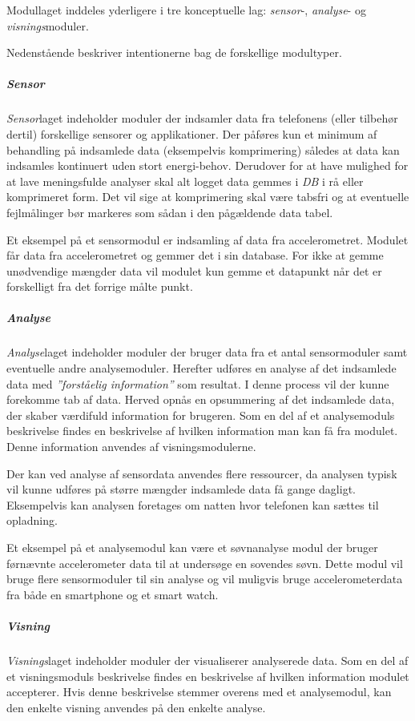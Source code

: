 Modullaget inddeles yderligere i tre konceptuelle lag: \textit{sensor}-, \textit{analyse}- og \textit{visnings}moduler.

Nedenstående beskriver intentionerne bag de forskellige modultyper.

\subparagraph{Sensor}
\textit{Sensor}laget indeholder moduler der indsamler data fra telefonens (eller tilbehør dertil) forskellige sensorer og applikationer.
Der påføres kun et minimum af behandling på indsamlede data (eksempelvis komprimering) således at data kan indsamles kontinuert uden stort energi-behov.
Derudover for at have mulighed for at lave meningsfulde analyser skal alt logget data gemmes i \textit{DB} i rå eller komprimeret form.
Det vil sige at komprimering skal være tabsfri og at eventuelle fejlmålinger bør markeres som sådan i den pågældende data tabel.

Et eksempel på et sensormodul er indsamling af data fra accelerometret.
Modulet får data fra accelerometret og gemmer det i sin database. 
For ikke at gemme unødvendige mængder data vil modulet kun gemme et datapunkt når det er forskelligt fra det forrige målte punkt.

\subparagraph{Analyse}
\textit{Analyse}laget indeholder moduler der bruger data fra et antal sensormoduler samt eventuelle andre analysemoduler.
Herefter udføres en analyse af det indsamlede data med \textit{''forståelig information''} som resultat.
I denne process vil der kunne forekomme tab af data.
Herved opnås en opsummering af det indsamlede data, der skaber værdifuld information for brugeren.
Som en del af et analysemoduls beskrivelse findes en beskrivelse af hvilken information man kan få fra modulet.
Denne information anvendes af visningsmodulerne.

Der kan ved analyse af sensordata anvendes flere ressourcer, da analysen typisk vil kunne udføres på større mængder indsamlede data få gange dagligt.
Eksempelvis kan analysen foretages om natten hvor telefonen kan sættes til opladning.

Et eksempel på et analysemodul kan være et søvnanalyse modul der bruger førnævnte accelerometer data til at undersøge en sovendes søvn.
Dette modul vil bruge flere sensormoduler til sin analyse og vil muligvis bruge accelerometerdata fra både en smartphone og et smart watch.

\subparagraph{Visning}
\textit{Visnings}laget indeholder moduler der visualiserer analyserede data.
Som en del af et visningsmoduls beskrivelse findes en beskrivelse af hvilken information modulet accepterer.
Hvis denne beskrivelse stemmer overens med et analysemodul, kan den enkelte visning anvendes på den enkelte analyse.

